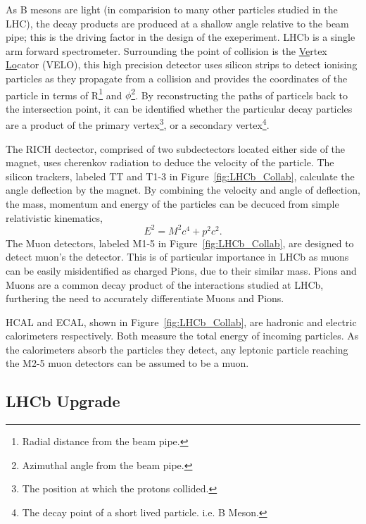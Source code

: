     As B mesons are light (in comparision to many other particles studied in the LHC), the decay products are produced at a shallow angle relative to the beam pipe;
    this is the driving factor in the design of the exeperiment. 
    LHCb is a single arm forward spectrometer.
    Surrounding the point of collision is the \underline{Ve}rtex \underline{Lo}cator (VELO), this high precision detector uses silicon strips to detect ionising particles as they propagate from a collision and provides the coordinates of the particle in terms of R\footnote{Radial distance from the beam pipe.} and $\phi$\footnote{Azimuthal angle from the beam pipe.}.
    By reconstructing the paths of particels back to the intersection point, it can be identified whether the particular decay particles are a product of the primary vertex\footnote{The position at which the protons collided.}, or a secondary vertex\footnote{The decay point of a short lived particle. i.e. B Meson.}.
    \par
    The RICH dectector, comprised of two subdectectors located either side of the magnet, uses cherenkov radiation to deduce the velocity of the particle. The silicon trackers, labeled TT and T1-3 in Figure~\ref{fig:LHCb_Collab}, calculate the angle deflection by the magnet. 
    By combining the velocity and angle of deflection, the mass, momentum and energy of the particles can be decuced from simple relativistic kinematics,
    \begin{equation}
      E^2 = M^2c^4 + p^2c^2.
    \end{equation}
    The Muon detectors, labeled M1-5 in Figure~\ref{fig:LHCb_Collab}, are designed to detect muon's the detector. 
    This is of particular importance in LHCb as muons can be easily misidentified as charged Pions, due to their similar mass.
    Pions and Muons are a common decay product of the interactions studied at LHCb, furthering the need to accurately differentiate Muons and Pions.
    \par
    HCAL and ECAL, shown in Figure~\ref{fig:LHCb_Collab}, are hadronic and electric calorimeters respectively. 
    Both measure the total energy of incoming particles.
    As the calorimeters absorb the particles they detect, any leptonic particle reaching the M2-5 muon detectors can be assumed to be a muon.

  \subsection{LHCb Upgrade} %
  \label{sub:lhcb_upgrade}

